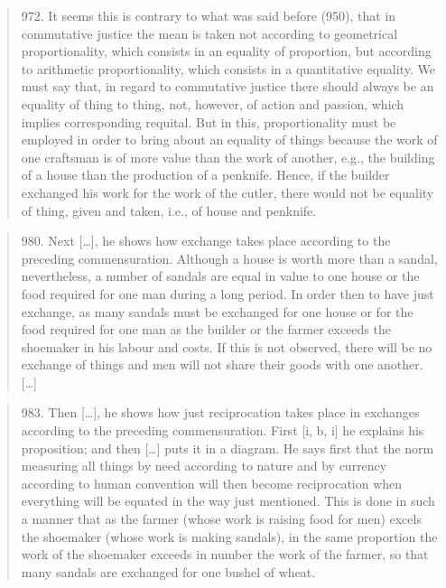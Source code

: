     \begin{quote}
        972. It seems this is contrary to what was said before (950), that in commutative justice the mean is taken not according to geometrical proportionality, which consists in an equality of proportion, but according to arithmetic proportionality, which consists in a quantitative equality. We must say that, in regard to commutative justice there should always be an equality of thing to thing, not, however, of action and passion, which implies corresponding requital. But in this, proportionality must be employed in order to bring about an equality of things because the work of one craftsman is of more value than the work of another, e.g., the building of a house than the production of a penknife. Hence, if the builder exchanged his work for the work of the cutler, there would not be equality of thing, given and taken, i.e., of house and penknife.
    \end{quote}

    \begin{quote}
        980. Next […], he shows how exchange takes place according to the preceding commensuration. Although a house is worth more than a sandal, nevertheless, a number of sandals are equal in value to one house or the food required for one man during a long period. In order then to have just exchange, as many sandals must be exchanged for one house or for the food required for one man as the builder or the farmer exceeds the shoemaker in his labour and costs. If this is not observed, there will be no exchange of things and men will not share their goods with one another. […]
    \end{quote}

    \begin{quote}
        983. Then […], he shows how just reciprocation takes place in exchanges according to the preceding commensuration. First [i, b, i] he explains his proposition; and then […] puts it in a diagram. He says first that the norm measuring all things by need according to nature and by currency according to human convention will then become reciprocation when everything will be equated in the way just mentioned. This is done in such a manner that as the farmer (whose work is raising food for men) excels the shoemaker (whose work is making sandals), in the same proportion the work of the shoemaker exceeds in number the work of the farmer, so that many sandals are exchanged for one bushel of wheat.
    \end{quote}

